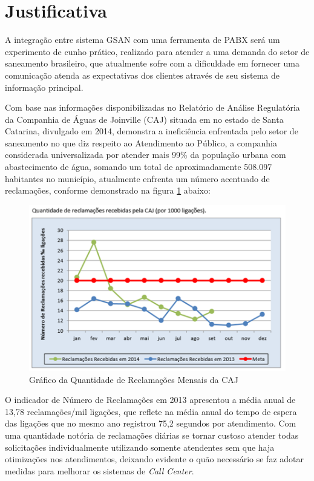 \section*{Justificativa}
A integração entre sistema GSAN com uma ferramenta de PABX será um experimento de cunho prático, realizado para atender a uma demanda do setor de saneamento brasileiro, que atualmente sofre com a dificuldade em fornecer uma comunicação atenda as expectativas dos clientes através de seu sistema de informação principal.

Com base nas informações disponibilizadas no Relatório de Análise Regulatória da Companhia de Águas de Joinville (CAJ) \cite{AMAE2014} 
situada em no estado de Santa Catarina, divulgado em 2014, demonstra a ineficiência enfrentada pelo setor de saneamento no que diz respeito ao Atendimento ao Público, a companhia considerada universalizada por atender mais 99\% da população urbana com abastecimento de água, somando um total de aproximadamente 508.097 habitantes no município, atualmente enfrenta um número acentuado de reclamações, conforme demonstrado na figura \ref{figura:ligacoesReclamacoes} abaixo:
 

\begin{figure}[H]
	\centering
	\caption{Gráfico da Quantidade de Reclamações Mensais da CAJ} 
	\label{figura:ligacoesReclamacoes}	
	\includegraphics{figuras/LigacoesReclamacoes.png}
\end{figure}


 O indicador de Número de Reclamações em 2013 apresentou a média anual de 13,78 reclamações/mil ligações, que reflete na média anual do tempo de espera das ligações que no mesmo ano registrou 75,2 segundos por atendimento. Com uma quantidade notória de reclamações diárias se tornar custoso atender todas solicitações individualmente utilizando somente atendentes sem que haja otimizações nos atendimentos,   deixando evidente o quão necessário se faz adotar medidas para melhorar os sistemas de \textit{Call Center}. 
 
